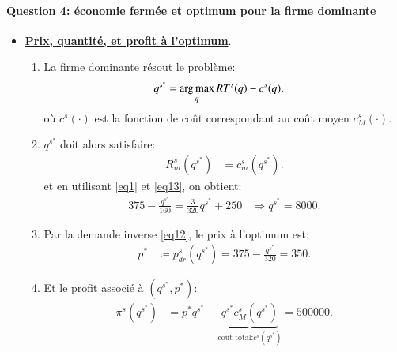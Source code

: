 \begin{frame}
  [allowframebreaks]{\insertsection}
  \framesubtitle{Question 4: économie fermée et optimum pour la firme dominante}
  \begin{itemize}
  \item \underline{\textbf{Prix, quantité, et profit à l'optimum}}.
  \begin{enumerate}[$\cdot$]
  \item La firme dominante résout le problème:
  \begin{align*}
  q^{s^*} &=\argmax_q  RT^s(q) - c^s(q),
  \end{align*}
  où $c^s(\cdot)$ est la fonction de coût correspondant au coût moyen $c_M^s(\cdot)$. 
  \item $q^{s^*} $ doit alors satisfaire:
  \begin{align*}
   R^s_m(q^{s^*}) &= c_m^s(q^{s^*}).
  \end{align*}
  et en utilisant \eqref{eq1} et \eqref{eq13}, on obtient:
  \begin{align*}
  375-  \frac{q^{s^*}}{160} = \frac{3}{320}q^{s^*} + 250&\Rightarrow  q^{s^*} = 8000.
  \end{align*}
  \item Par la demande inverse \eqref{eq12}, le prix à l'optimum est:
  \begin{align*}
  p^*&\coloneqq  p_{dr}^s(q^{s^*})  = 375 - \frac{q^{s^*}}{320} = 350.
  \end{align*}
  \item Et le profit associé à $(q^{s^*}, p^*)$:
  \begin{align*}
  \pi^s(q^{s^*}) &= p^*q^{s^*} - \underbrace{q^{s^*} c_M^s(q^{s^*})}_{\text{coût total:} c^s(q^{s^*})} = 500000.
  \end{align*}
  \end{enumerate}
  \end{itemize}
  \end{frame}
  
